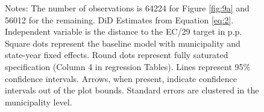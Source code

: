 \begin{figure}[h!]
\begin{center}
    \end{center}
    \scriptsize{Notes: The number of observations is 64224 for Figure \ref{fig:9a} and 56012 for the remaining. DiD Estimates from Equation \ref{eq:2}. Independent variable is the distance to the EC/29 target in p.p. Square dots represent the baseline model with municipality and state-year fixed effects. Round dots represent fully saturated specification (Column 4 in regression Tables). Lines represent 95\% confidence intervals. Arrows, when present, indicate confidence intervals out of the plot bounds. Standard errors are clustered in the municipality level.}
    
\end{figure}